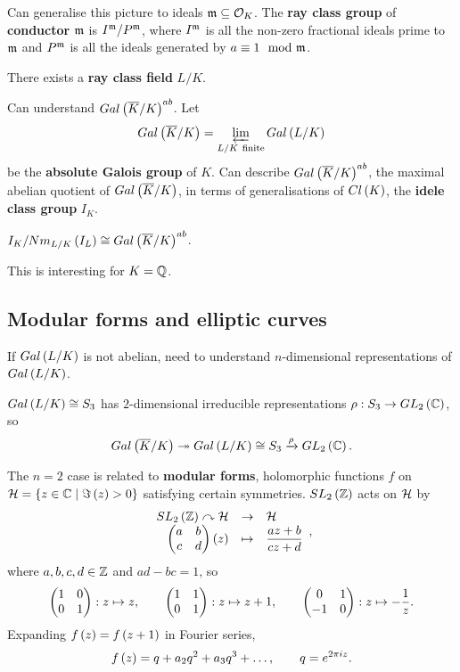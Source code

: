 \pagebreak

Can generalise this picture to ideals $ \mathfrak{m} \subseteq \mathcal{O}_K $. The \textbf{ray class group} of \textbf{conductor} $ \mathfrak{m} $ is $ I^{\mathfrak{m}} / P^{\mathfrak{m}} $, where $ I^{\mathfrak{m}} $ is all the non-zero fractional ideals prime to $ \mathfrak{m} $ and $ P^{\mathfrak{m}} $ is all the ideals generated by $ a \equiv 1 \mod {\mathfrak{m}} $.

\begin{theorem}
There exists a \textbf{ray class field} $ L / K $.
\end{theorem}

Can understand $ Gal\left( \overline{K} / K \right)^{ab} $. Let
$$ Gal\left( \overline{K} / K \right) = \varprojlim_{L / K \ \text{finite}} Gal\left( L / K \right) $$
be the \textbf{absolute Galois group} of $ K $. Can describe $ Gal\left( \overline{K} / K \right)^{ab} $, the maximal abelian quotient of $ Gal\left( \overline{K} / K \right) $, in terms of generalisations of $ Cl\left( K \right) $, the \textbf{idele class group} $ I_K $.

\begin{theorem}
$ I_K / Nm_{L / K}\left( I_L \right) \cong Gal\left( \overline{K} / K \right)^{ab} $.
\end{theorem}

This is interesting for $ K = \mathbb{Q} $.

\subsection{Modular forms and elliptic curves}

If $ Gal\left( L / K \right) $ is not abelian, need to understand $ n $-dimensional representations of $ Gal\left( L / K \right) $.

\begin{example*}
$ Gal\left( L / K \right) \cong S_3 $ has $ 2 $-dimensional irreducible representations $ \rho : S_3 \to GL_2\left( \mathbb{C} \right) $, so
$$ Gal\left( \overline{K} / K \right) \twoheadrightarrow Gal\left( L / K \right) \cong S_3 \xrightarrow{\rho} GL_2\left( \mathbb{C} \right). $$
\end{example*}

The $ n = 2 $ case is related to \textbf{modular forms}, holomorphic functions $ f $ on $ \mathcal{H} = \left\{ z \in \mathbb{C} \mid \Im\left( z \right) > 0 \right\} $ satisfying certain symmetries. $ SL_2\left( \mathbb{Z} \right) $ acts on $ \mathcal{H} $ by
$$ \function{SL_2\rb{\Z} \curvearrowright \HH}{\HH}{\twobytwo{a}{b}{c}{d}\rb{z}}{\dfrac{az + b}{cz + d}}, $$
where $ a, b, c, d \in \mathbb{Z} $ and $ ad - bc = 1 $, so
$$ \begin{pmatrix} 1 & 0 \\ 0 & 1 \end{pmatrix} : z \mapsto z, \qquad \begin{pmatrix} 1 & 1 \\ 0 & 1 \end{pmatrix} : z \mapsto z + 1, \qquad \begin{pmatrix} 0 & 1 \\ -1 & 0 \end{pmatrix} : z \mapsto -\dfrac{1}{z}. $$
Expanding $ f\left( z \right) = f\left( z + 1 \right) $ in Fourier series,
$$ f\left( z \right) = q + a_2q^2 + a_3q^3 + \dots, \qquad q = e^{2\pi iz}. $$

